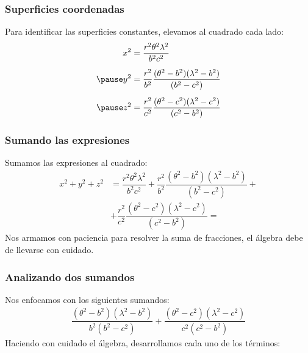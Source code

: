 \documentclass[12pt]{beamer}
\begin{document}
\begin{frame}
\frametitle{Superficies coordenadas}
Para identificar las superficies constantes, elevamos al cuadrado cada lado:
\pause
\begin{eqnarray*}
\begin{aligned}
x^{2} &= \dfrac{r^{2} \theta^{2} \lambda^{2}}{b^{2} c^{2}} \\[0.5em] \pause
y^{2} &= \dfrac{r^{2}}{b^{2}} \dfrac{(\theta^{2} - b^{2})(\lambda^{2} - b^{2})}{(b^{2} - c^{2})} \\[0.5em] \pause
z^{2} &= \dfrac{r^{2}}{c^{2}} \dfrac{(\theta^{2} - c^{2})(\lambda^{2} - c^{2})}{(c^{2} - b^{2})}
\end{aligned}
\end{eqnarray*}
\end{frame}
\begin{frame}
\frametitle{Sumando las expresiones}
Sumamos las expresiones al cuadrado:
\begin{align*}
x^{2} + y^{2} + z^{2} &= \dfrac{r^{2} \theta^{2} \lambda^{2}}{b^{2} c^{2}} + \dfrac{r^{2}}{b^{2}} \dfrac{(\theta^{2} - b^{2})(\lambda^{2} - b^{2})}{(b^{2} - c^{2})} + \\[0.5em]
&+ \dfrac{r^{2}}{c^{2}} \dfrac{(\theta^{2} - c^{2})(\lambda^{2} - c^{2})}{(c^{2} - b^{2})} =
\end{align*}
\pause
Nos armamos con paciencia para resolver la suma de fracciones, el álgebra debe de llevarse con cuidado.
\end{frame}
\begin{frame}
\frametitle{Analizando dos sumandos}
Nos enfocamos con los siguientes sumandos:
\pause
\begin{align*}
\dfrac{(\theta^{2} - b^{2})(\lambda^{2} - b^{2})}{b^{2}(b^{2} - c^{2})} + \dfrac{(\theta^{2} - c^{2})(\lambda^{2} - c^{2})}{c^{2}(c^{2} - b^{2})}
\end{align*}
\pause
Haciendo con cuidado el álgebra, desarrollamos cada uno de los términos:
\end{frame}
\end{document}
